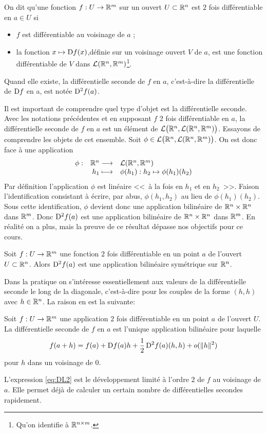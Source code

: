 \documentclass[11pt, a4paper]{article}
\begin{document}
\begin{defn}
  On dit qu'une fonction $f : U \to \mathbb{R}^m$ sur un ouvert
  $U \subset \mathbb{R}^n$ est $2$ fois différentiable en $a \in U$ si
  \begin{itemize}
  \item[\textbullet] $f$ est différentiable au voisinage de $a$ ;
  \item[\textbullet] la fonction $x \mapsto \operatorname{D\!}{f}(x)$,définie sur un
    voisinage ouvert $V$ de $a$, est une fonction différentiable de $V$ dans
    $\mathcal{L}(\mathbb{R}^n, \mathbb{R}^m)$\footnote{Qu'on identifie à $\mathbb{R}^{n\times m}$.}.
  \end{itemize}
  Quand elle existe, la différentielle seconde de $f$ en $a$,
  c'est-à-dire la différentielle de $\operatorname{D\!}{f}$ en a, est notée
  $\operatorname{D\!}{^2f}(a)$.
\end{defn}
Il est important de comprendre quel type d'objet est la différentielle
seconde. Avec les notations précédentes et en supposant $f$ $2$ fois
différentiable en $a$, la différentielle seconde de $f$ en $a$ est un
élément de $\mathcal{L}\big(\mathbb{R}^n, \mathcal{L}(\mathbb{R}^n, \mathbb{R}^m)\big)$. Essayons de
comprendre les objets de cet ensemble. Soit
$\phi \in \mathcal{L}\big(\mathbb{R}^n, \mathcal{L}(\mathbb{R}^n, \mathbb{R}^m)\big)$. On est donc face
à une application
\[
\begin{array}{rrl}
  \phi : & \mathbb{R}^n \longrightarrow & \mathcal{L}(\mathbb{R}^n, \mathbb{R}^m) \\
  & h_1 \longmapsto & \phi(h_1) : h_2 \mapsto \phi(h_1)(h_2) 
\end{array}
\] 
Par définition l'application $\phi$ est linéaire <<\, à la fois en
$h_1$ et en $h_2$ \,>>. Faison l'identification consistant à écrire,
par abus, $\phi(h_1, h_2)$ au lieu de $\phi(h_1)(h_2)$. Sous cette
identification, $\phi$ devient donc une application bilinéaire de
$\mathbb{R}^n\times \mathbb{R}^n$ dans $\mathbb{R}^m$. Donc $\operatorname{D\!}{^2f}(a)$ est une application
bilinéaire de $\mathbb{R}^n \times \mathbb{R}^n$ dans $\mathbb{R}^m$. En réalité on a plus,
mais la preuve de ce résultat dépasse nos objectifs pour ce cours.
\begin{thm}
  Soit $f : U \to \mathbb{R}^m$ une fonction $2$ fois différentiable en un
  point $a$ de l'ouvert $U \subset \mathbb{R}^n$. Alors $\operatorname{D\!}{^2f}(a)$ est une
  application bilinéaire symétrique sur $\mathbb{R}^n$.
\end{thm}
Dans la pratique on s'intéresse essentiellement aux valeurs de la
différentielle seconde le long de la diagonale, c'est-à-dire pour les
couples de la forme $(h, h)$ avec $h \in \mathbb{R}^n$. La raison en est la
suivante:
\begin{prop}
  Soit $f : U \to \mathbb{R}^m$ une application $2$ fois différentiable en un
  point $a$ de l'ouvert $U$. La différentielle seconde de $f$ en $a$
  est l'unique application bilinéaire pour laquelle
  \begin{equation}
    \label{eq:DL2}
    f(a+h) = f(a) + \operatorname{D\!}{f}(a)h + \dfrac{1}{2} \operatorname{D\!}{^2f}(a)(h, h) + o(\|h\|^2)
  \end{equation}
  pour $h$ dans un voisinage de $0$. 
\end{prop}
\noindent L'expression \eqref{eq:DL2} est le développement limité à
l'ordre $2$ de $f$ au voisinage de $a$. Elle permet déjà de calculer
un certain nombre de différentielles secondes rapidement.
\end{document}
